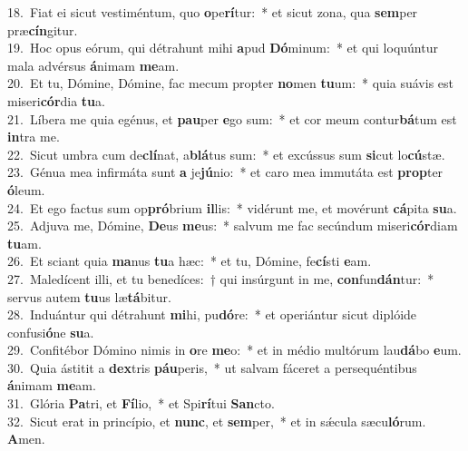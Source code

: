 {18.~}Fiat ei sicut vestiméntum, quo \textbf{o}pe\textbf{rí}tur:~* et sicut zona, qua \textbf{sem}per præ\textbf{cín}gitur.\\
{19.~}Hoc opus eórum, qui détrahunt mihi \textbf{a}pud \textbf{Dó}minum:~* et qui loquúntur mala advérsus \textbf{á}nimam \textbf{me}am.\\
{20.~}Et tu, Dómine, Dómine, fac mecum propter \textbf{no}men \textbf{tu}um:~* quia suávis est miseri\textbf{cór}dia \textbf{tu}a.\\
{21.~}Líbera me quia egénus, et \textbf{pau}per \textbf{e}go sum:~* et cor meum contur\textbf{bá}tum est \textbf{in}tra me.\\
{22.~}Sicut umbra cum de\textbf{clí}nat, a\textbf{blá}tus sum:~* et excússus sum \textbf{si}cut lo\textbf{cú}stæ.\\
{23.~}Génua mea infirmáta sunt \textbf{a} je\textbf{jú}nio:~* et caro mea immutáta est \textbf{prop}ter \textbf{ó}leum.\\
{24.~}Et ego factus sum op\textbf{pró}brium \textbf{il}lis:~* vidérunt me, et movérunt \textbf{cá}pita \textbf{su}a.\\
{25.~}Adjuva me, Dómine, \textbf{De}us \textbf{me}us:~* salvum me fac secúndum miseri\textbf{cór}diam \textbf{tu}am.\\
{26.~}Et sciant quia \textbf{ma}nus \textbf{tu}a hæc:~* et tu, Dómine, fe\textbf{cí}sti \textbf{e}am.\\
{27.~}Maledícent illi, et tu benedíces:~† qui insúrgunt in me, \textbf{con}fun\textbf{dán}tur:~* servus autem \textbf{tu}us læ\textbf{tá}bitur.\\
{28.~}Induántur qui détrahunt \textbf{mi}hi, pu\textbf{dó}re:~* et operiántur sicut diplóide confusi\textbf{ó}ne \textbf{su}a.\\
{29.~}Confitébor Dómino nimis in \textbf{o}re \textbf{me}o:~* et in médio multórum lau\textbf{dá}bo \textbf{e}um.\\
{30.~}Quia ástitit a \textbf{dex}tris \textbf{páu}peris,~* ut salvam fáceret a persequéntibus \textbf{á}nimam \textbf{me}am.\\
{31.~}Glória \textbf{Pa}tri, et \textbf{Fí}lio,~* et Spi\textbf{rí}tui \textbf{San}cto.\\
{32.~}Sicut erat in princípio, et \textbf{nunc}, et \textbf{sem}per,~* et in sǽcula sæcu\textbf{ló}rum. \textbf{A}men.\\
